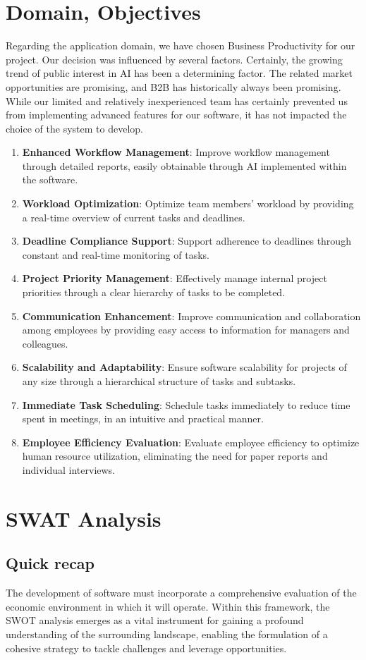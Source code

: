 \documentclass{article}
\begin{document}
\section{Domain, Objectives}
Regarding the application domain, we have chosen Business Productivity for our project. 
Our decision was influenced by several factors. Certainly, the growing trend of public interest in AI has been a determining factor. The related market opportunities are promising, and B2B has historically always been promising. 
While our limited and relatively inexperienced team has certainly prevented us from implementing advanced features for our software, it has not impacted the choice of the system to develop.
\begin{enumerate}
\item \textbf{Enhanced Workflow Management}: Improve workflow management through detailed reports, easily obtainable through AI implemented within the software.
\item \textbf{Workload Optimization}: Optimize team members' workload by providing a real-time overview of current tasks and deadlines.
\item \textbf{Deadline Compliance Support}: Support adherence to deadlines through constant and real-time monitoring of tasks.
\item \textbf{Project Priority Management}: Effectively manage internal project priorities through a clear hierarchy of tasks to be completed.
\item \textbf{Communication Enhancement}: Improve communication and collaboration among employees by providing easy access to information for managers and colleagues.
\item \textbf{Scalability and Adaptability}: Ensure software scalability for projects of any size through a hierarchical structure of tasks and subtasks.
\item \textbf{Immediate Task Scheduling}: Schedule tasks immediately to reduce time spent in meetings, in an intuitive and practical manner.
\item \textbf{Employee Efficiency Evaluation}: Evaluate employee efficiency to optimize human resource utilization, eliminating the need for paper reports and individual interviews.
\end{enumerate}

\section{SWAT Analysis}
\subsection{Quick recap}
The development of software must incorporate a comprehensive evaluation of the economic environment in which it will operate.
Within this framework, the SWOT analysis emerges as a vital instrument for gaining a profound understanding of the surrounding landscape, enabling the formulation of a cohesive strategy to tackle challenges and leverage opportunities.
\end{document}
